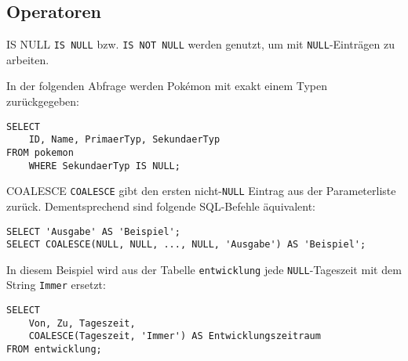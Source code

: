 \subsection{Operatoren}

\begin{sql}{IS NULL}
    \texttt{IS NULL} bzw. \texttt{IS NOT NULL} werden genutzt, um mit \texttt{NULL}-Einträgen zu arbeiten.

    In der folgenden Abfrage werden Pokémon mit exakt einem Typen zurückgegeben:

    \begin{verbatim}
SELECT
    ID, Name, PrimaerTyp, SekundaerTyp
FROM pokemon
    WHERE SekundaerTyp IS NULL;
    \end{verbatim}

    
\end{sql}

\begin{sql}{COALESCE}
    \texttt{COALESCE} gibt den ersten nicht-\texttt{NULL} Eintrag aus der Parameterliste zurück.
    Dementsprechend sind folgende SQL-Befehle äquivalent:

    \begin{verbatim}
SELECT 'Ausgabe' AS 'Beispiel';
SELECT COALESCE(NULL, NULL, ..., NULL, 'Ausgabe') AS 'Beispiel';
    \end{verbatim}

    

    In diesem Beispiel wird aus der Tabelle \texttt{entwicklung} jede \texttt{NULL}-Tageszeit mit dem String \texttt{Immer} ersetzt:

    \begin{verbatim}
SELECT
    Von, Zu, Tageszeit,
    COALESCE(Tageszeit, 'Immer') AS Entwicklungszeitraum
FROM entwicklung;
    \end{verbatim}

    
\end{sql}

